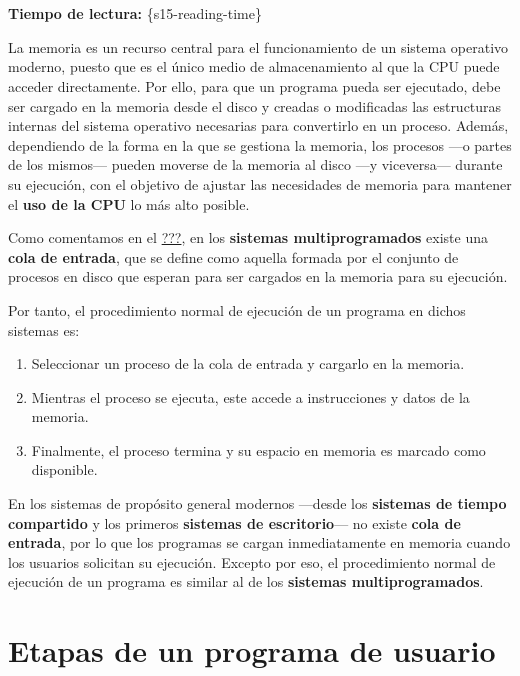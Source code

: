 \section{}

\textbf{Tiempo de lectura:} \{s15-reading-time\}

La memoria es un recurso central para el funcionamiento de un sistema
operativo moderno, puesto que es el único medio de almacenamiento al que
la CPU puede acceder directamente. Por ello, para que un programa pueda
ser ejecutado, debe ser cargado en la memoria desde el disco y creadas o
modificadas las estructuras internas del sistema operativo necesarias
para convertirlo en un proceso. Además, dependiendo de la forma en la
que se gestiona la memoria, los procesos ---o partes de los mismos---
pueden moverse de la memoria al disco ---y viceversa--- durante su
ejecución, con el objetivo de ajustar las necesidades de memoria para
mantener el \textbf{uso de la CPU} lo más alto posible.

Como comentamos en el \hyperref[_sistemas_multiprogramados]{???}, en los
\textbf{sistemas multiprogramados} existe una \textbf{cola de entrada},
que se define como aquella formada por el conjunto de procesos en disco
que esperan para ser cargados en la memoria para su ejecución.

Por tanto, el procedimiento normal de ejecución de un programa en dichos
sistemas es:

\begin{enumerate}
\def\labelenumi{\arabic{enumi}.}
\item
  Seleccionar un proceso de la cola de entrada y cargarlo en la memoria.
\item
  Mientras el proceso se ejecuta, este accede a instrucciones y datos de
  la memoria.
\item
  Finalmente, el proceso termina y su espacio en memoria es marcado como
  disponible.
\end{enumerate}

En los sistemas de propósito general modernos ---desde los
\textbf{sistemas de tiempo compartido} y los primeros \textbf{sistemas
de escritorio}--- no existe \textbf{cola de entrada}, por lo que los
programas se cargan inmediatamente en memoria cuando los usuarios
solicitan su ejecución. Excepto por eso, el procedimiento normal de
ejecución de un programa es similar al de los \textbf{sistemas
multiprogramados}.

\section{Etapas de un programa de
usuario}\label{_etapas_de_un_programa_de_usuario}


